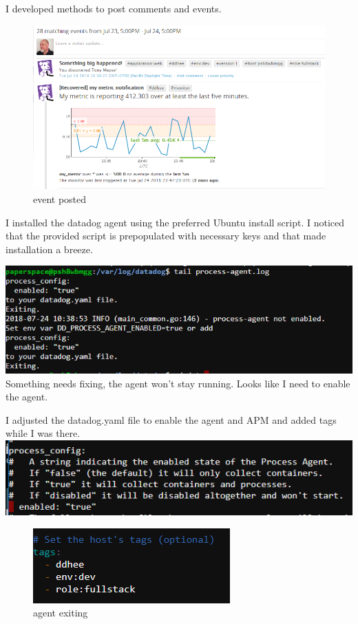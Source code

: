 \documentclass[11pt]{article}
\makeatletter
\def\maxwidth{\ifdim\Gin@nat@width>\linewidth\linewidth
    \else\Gin@nat@width\fi}
\let\Oldincludegraphics\includegraphics
\renewcommand{\includegraphics}[1]{\Oldincludegraphics[width=.8\maxwidth]{#1}}
\makeatother
\begin{document}
I developed methods to post comments and events.

\begin{figure}
\centering
\includegraphics{images/event.png}
\caption{event posted}
\end{figure}

    I installed the datadog agent using the preferred Ubuntu install script.
I noticed that the provided script is prepopulated with necessary keys
and that made installation a breeze.

\includegraphics{images/agent_exit.PNG} Something needs fixing, the
agent won't stay running. Looks like I need to enable the agent.

I adjusted the datadog.yaml file to enable the agent and APM and added
tags while I was there. \includegraphics{images/epa.PNG}

\begin{figure}
\centering
\includegraphics{images/tic.PNG}
\caption{agent exiting}
\end{figure}
\end{document}
